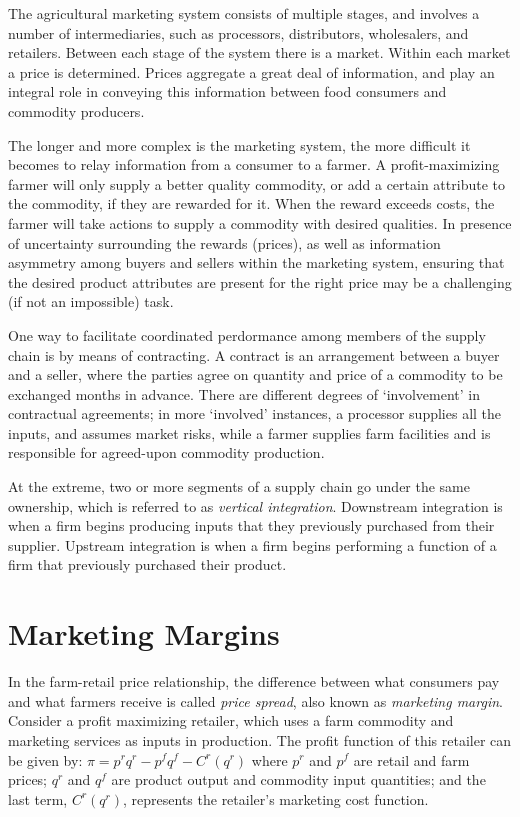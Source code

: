 \documentclass[
]{book}
\begin{document}
The agricultural marketing system consists of multiple stages, and involves a number of intermediaries, such as processors, distributors, wholesalers, and retailers. Between each stage of the system there is a market. Within each market a price is determined. Prices aggregate a great deal of information, and play an integral role in conveying this information between food consumers and commodity producers.

The longer and more complex is the marketing system, the more difficult it becomes to relay information from a consumer to a farmer. A profit-maximizing farmer will only supply a better quality commodity, or add a certain attribute to the commodity, if they are rewarded for it. When the reward exceeds costs, the farmer will take actions to supply a commodity with desired qualities. In presence of uncertainty surrounding the rewards (prices), as well as information asymmetry among buyers and sellers within the marketing system, ensuring that the desired product attributes are present for the right price may be a challenging (if not an impossible) task.

One way to facilitate coordinated perdormance among members of the supply chain is by means of contracting. A contract is an arrangement between a buyer and a seller, where the parties agree on quantity and price of a commodity to be exchanged months in advance. There are different degrees of `involvement' in contractual agreements; in more `involved' instances, a processor supplies all the inputs, and assumes market risks, while a farmer supplies farm facilities and is responsible for agreed-upon commodity production.

At the extreme, two or more segments of a supply chain go under the same ownership, which is referred to as \emph{vertical integration}. Downstream integration is when a firm begins producing inputs that they previously purchased from their supplier. Upstream integration is when a firm begins performing a function of a firm that previously purchased their product.

\hypertarget{marketing-margins}{%
\section{Marketing Margins}\label{marketing-margins}}

In the farm-retail price relationship, the difference between what consumers pay and what farmers receive is called \emph{price spread}, also known as \emph{marketing margin}. Consider a profit maximizing retailer, which uses a farm commodity and marketing services as inputs in production. The profit function of this retailer can be given by: \(\pi = p^r q^r - p^f q^f - C^r(q^r)\) where \(p^r\) and \(p^f\) are retail and farm prices; \(q^r\) and \(q^f\) are product output and commodity input quantities; and the last term, \(C^r(q^r)\), represents the retailer's marketing cost function.
\end{document}
